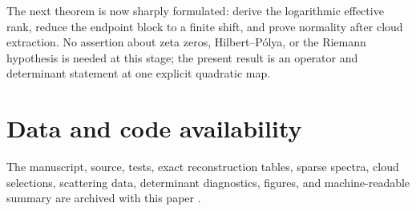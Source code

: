 \documentclass[11pt]{article}
\theoremstyle{definition}
\theoremstyle{remark}
\begin{document}
The next theorem is now sharply formulated: derive the logarithmic effective
rank, reduce the endpoint block to a finite shift, and prove normality after
cloud extraction.  No assertion about zeta zeros, Hilbert--P\'olya, or the
Riemann hypothesis is needed at this stage; the present result is an operator
and determinant statement at one explicit quadratic map.

\section*{Data and code availability}

The manuscript, source, tests, exact reconstruction tables, sparse spectra,
cloud selections, scattering data, determinant diagnostics, figures, and
machine-readable summary are archived with this paper
\citep{WangBulkScatteringCode2026}.



\end{document}
